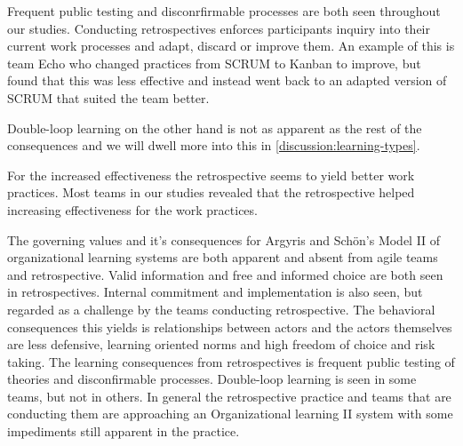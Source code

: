 Frequent public testing and disconrfirmable processes are both seen throughout our studies. Conducting retrospectives enforces participants inquiry into their current work processes and adapt, discard or improve them. An example of this is team Echo who changed practices from SCRUM to Kanban to improve, but found that this was less effective and instead went back to an adapted version of SCRUM that suited the team better. 

Double-loop learning on the other hand is not as apparent as the rest of the consequences and we will dwell more into this in \autoref{discussion:learning-types}. 

For the increased effectiveness the retrospective seems to yield better work practices. Most teams in our studies revealed that the retrospective helped increasing effectiveness for the work practices. 

The governing values and it's consequences for Argyris and Schön's Model II of organizational learning systems are both apparent and absent from agile teams and retrospective. Valid information and free and informed choice are both seen in retrospectives. Internal commitment and implementation is also seen, but regarded as a challenge by the teams conducting retrospective. The behavioral consequences this yields is relationships between actors and the actors themselves are less defensive, learning oriented norms and high freedom of choice and risk taking. The learning consequences from retrospectives is frequent public testing of theories and disconfirmable processes. Double-loop learning is seen in some teams, but not in others. In general the retrospective practice and teams that are conducting them are approaching an Organizational learning II system with some impediments still apparent in the practice.


